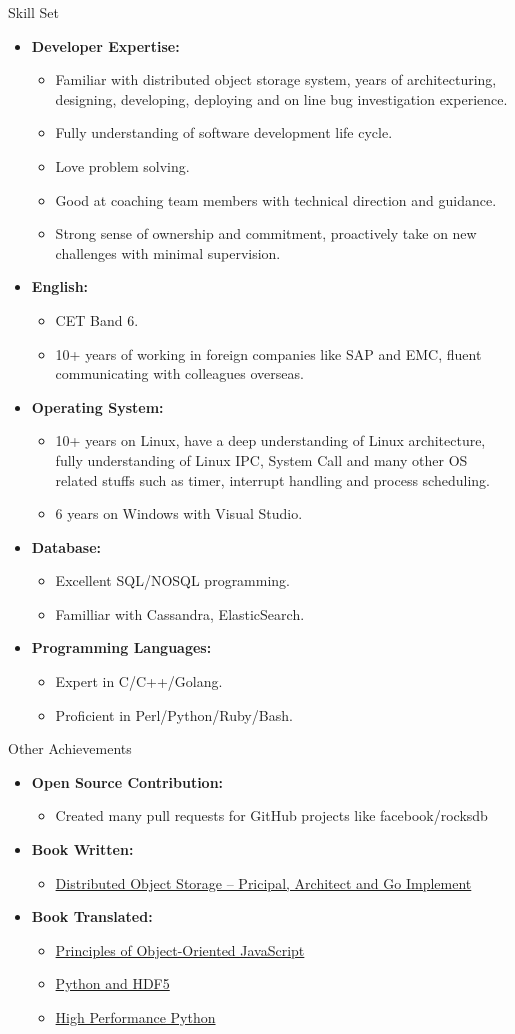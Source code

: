\documentclass[11pt,oneside]{article}
\newenvironment{ressection}[1]{
	\vspace{4pt}
	{\selectfont\Large#1}
	\begin{itemize}
	\vspace{3pt}
}{
	\end{itemize}
}
\newcommand{\resitem}[1]{
	\vspace{-4pt}
	\item \begin{flushleft} #1 \end{flushleft}
}
\newcommand{\ressubitem}[1]{
	\vspace{-1pt}
	\item \begin{flushleft} #1 \end{flushleft}
}
\newenvironment{reslist}[1]{
	\resitem{\textbf{#1}}
	\vspace{-5pt}
	\begin{itemize}
}{
	\end{itemize}
}
\begin{document}
\begin{ressection}{Skill Set}

	\begin{reslist}{Developer Expertise:}
		\ressubitem{Familiar with distributed object storage system, years of architecturing, designing, developing, deploying and on line bug investigation experience.}
		\ressubitem{Fully understanding of software development life cycle.}
		\ressubitem{Love problem solving.}
		\ressubitem{Good at coaching team members with technical direction and guidance.}
		\ressubitem{Strong sense of ownership and commitment, proactively take on new challenges with minimal supervision.}
	\end{reslist}

	\begin{reslist}{English:}
		\ressubitem{CET Band 6.}
		\ressubitem{10+ years of working in foreign companies like SAP and EMC, fluent communicating with colleagues overseas.}
	\end{reslist}

	\begin{reslist}{Operating System:}
		\ressubitem{10+ years on Linux, have a deep understanding of Linux architecture,
			fully understanding of Linux IPC, System Call and
			many other OS related stuffs such as timer, interrupt handling and process scheduling.}
		\ressubitem{6 years on Windows with Visual Studio.}
	\end{reslist}

	\begin{reslist}{Database:}
		\ressubitem{Excellent SQL/NOSQL programming.}
		\ressubitem{Familliar with Cassandra, ElasticSearch.}
	\end{reslist}

	\begin{reslist}{Programming Languages:}
		\ressubitem{Expert in C/C++/Golang.}
		\ressubitem{Proficient in Perl/Python/Ruby/Bash.}
	\end{reslist}

\end{ressection}

\begin{ressection}{Other Achievements}

	\begin{reslist}{Open Source Contribution:}
	        \ressubitem{Created many pull requests for GitHub projects like facebook/rocksdb}
	\end{reslist}

	\begin{reslist}{Book Written:}
	        \ressubitem{\href{https://www.epubit.com/book/detail/35229}{Distributed Object Storage -- Pricipal, Architect and Go Implement}}
	\end{reslist}

	\begin{reslist}{Book Translated:}
		\ressubitem{\href{https://www.epubit.com/book/detail/33175}{Principles of Object-Oriented JavaScript}}
		\ressubitem{\href{https://www.epubit.com/book/detail/15126}{Python and HDF5}}
		\ressubitem{\href{https://www.epubit.com/book/detail/14722}{High Performance Python}}
	\end{reslist}

\end{ressection}
\end{document}
